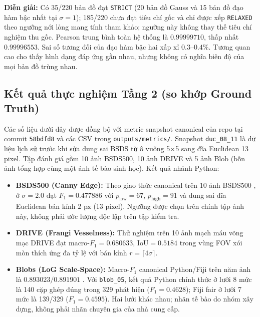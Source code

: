 \documentclass[conference]{IEEEtran}
\begin{document}
\textbf{Diễn giải:} Có 35/220 bản đồ đạt \texttt{STRICT} (20 bản đồ Gauss và 15 bản đồ đạo hàm bậc nhất tại $\sigma=1$); 185/220 chưa đạt tiêu chí gốc và chỉ được xếp \texttt{RELAXED} theo ngưỡng nới lỏng mang tính tham khảo; ngưỡng này không thay thế tiêu chí nghiệm thu gốc. Pearson trung bình toàn hệ thống là $0.99999710$, thấp nhất $0.99996553$. Sai số tương đối của đạo hàm bậc hai xấp xỉ $0.3$--$0.4\%$. Tương quan cao cho thấy hình dạng đáp ứng gần nhau, nhưng không có nghĩa biên độ của mọi bản đồ trùng nhau.

\subsection{Kết quả thực nghiệm Tầng 2 (so khớp Ground Truth)}
Các số liệu dưới đây được đồng bộ với metric snapshot canonical của repo tại commit \texttt{58bdfd8} và các CSV trong \texttt{outputs/metrics/}. Snapshot \texttt{duc\_08\_11} là dữ liệu lịch sử trước khi sửa dung sai BSDS từ ô vuông 5$\times$5 sang đĩa Euclidean 13 pixel.
Tập đánh giá gồm 10 ảnh BSDS500, 10 ảnh DRIVE và 5 ảnh Blob (bốn ảnh tổng hợp cùng một ảnh tế bào sinh học). Kết quả nhánh Python:
\begin{itemize}
    \item \textbf{BSDS500 (Canny Edge):} Theo giao thức canonical trên 10 ảnh BSDS500 \cite{arbelaez2010contour,xlaRepository}, ở $\sigma=2.0$ đạt $F_1=0.477886$ với $p_{\text{low}}=67$, $p_{\text{high}}=91$ và dung sai đĩa Euclidean bán kính 2 px (13 pixel). Ngưỡng được chọn trên chính tập ảnh này, không phải ước lượng độc lập trên tập kiểm tra.
    \item \textbf{DRIVE (Frangi Vesselness):} Thử nghiệm trên 10 ảnh mạch máu võng mạc DRIVE \cite{staal2004ridge,xlaRepository} đạt macro-$F_1=0.680633$, $\text{IoU}=0.5184$ trong vùng FOV xói mòn thích ứng đa tỷ lệ với bán kính $r=\lceil4\sigma\rceil$.
    \item \textbf{Blobs (LoG Scale-Space):} Macro-$F_1$ canonical Python/Fiji trên năm ảnh là $0.893023/0.891901$ \cite{xlaRepository}. Với \texttt{blob\_05}, kết quả Python chính thức ở lưới 8 mức là 140 cặp ghép đúng trong 329 phát hiện ($F_1=0.4628$); Fiji fair ở lưới 7 mức là 139/329 ($F_1=0.4595$). Hai lưới khác nhau; nhãn tế bào do nhóm xây dựng, không phải nhãn chuyên gia của nhà cung cấp.
\end{itemize}
\end{document}
